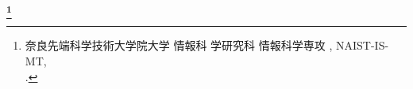 \begin{center}
 \renewcommand{\thefootnote}{\fnsymbol{footnote}}
 \Large\bfseries \jtitle \footnote[1]{奈良先端科学技術大学院大学 情報科
 学研究科 情報科学専攻 \jdoctitle, NAIST-IS-MT\studentnumber,\\ \jdate.}
 \renewcommand{\thefootnote}{\arabic{footnote}}
\end{center}

\vspace*{1truemm}

\begin{center}
 \large\jauthor
\end{center}

\vspace*{1truemm}

\begin{center}
\end{center}

\vspace*{2truemm}
\par
\jabstract
\vspace*{5truemm}

\begin{flushleft}
\end{flushleft}
\vspace{-2mm}\keywords